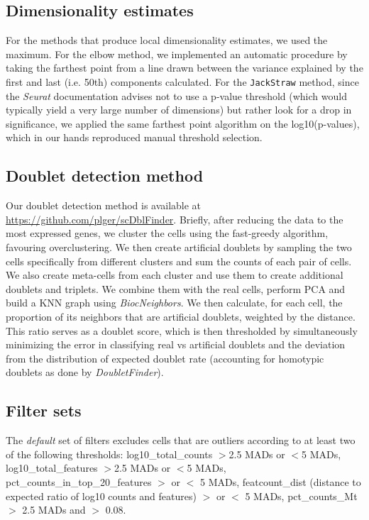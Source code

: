 \documentclass[11pt]{article}
\begin{document}
\subsection*{Dimensionality estimates}

For the methods that produce local dimensionality estimates, we used the maximum. For the elbow method, we implemented an automatic procedure by taking the farthest point from a line drawn between the variance explained by the first and last (i.e. 50th) components calculated. For the \texttt{JackStraw} method, since the \textit{Seurat} documentation advises not to use a p-value threshold (which would typically yield a very large number of dimensions) but rather look for a drop in significance, we applied the same farthest point algorithm on the log10(p-values), which in our hands reproduced manual threshold selection.

\subsection*{Doublet detection method}
Our doublet detection method is available at \url{https://github.com/plger/scDblFinder}. Briefly, after reducing the data to the most expressed genes, we cluster the cells using the fast-greedy algorithm, favouring overclustering. We then create artificial doublets by sampling the two cells specifically from different clusters and sum the counts of each pair of cells. We also create meta-cells from each cluster and use them to create additional doublets and triplets. We combine them with the real cells, perform PCA and build a KNN graph using \textit{BiocNeighbors}. We then calculate, for each cell, the proportion of its neighbors that are artificial doublets, weighted by the distance. This ratio serves as a doublet score, which is then thresholded by simultaneously minimizing the error in classifying real vs artificial doublets and the deviation from the distribution of expected doublet rate (accounting for homotypic doublets as done by \textit{DoubletFinder}).

\subsection*{Filter sets}
The \textit{default} set of filters excludes cells that are outliers according to at least two of the following thresholds: log10\_total\_counts $>$2.5 MADs or $<$5 MADs, log10\_total\_features $>$2.5 MADs or $<$5 MADs, pct\_counts\_in\_top\_20\_features $>$ or $<$ 5 MADs, featcount\_dist (distance to expected ratio of log10 counts and features) $>$ or $<$ 5 MADs, pct\_counts\_Mt $>$ 2.5 MADs and $>$ 0.08.
\end{document}
